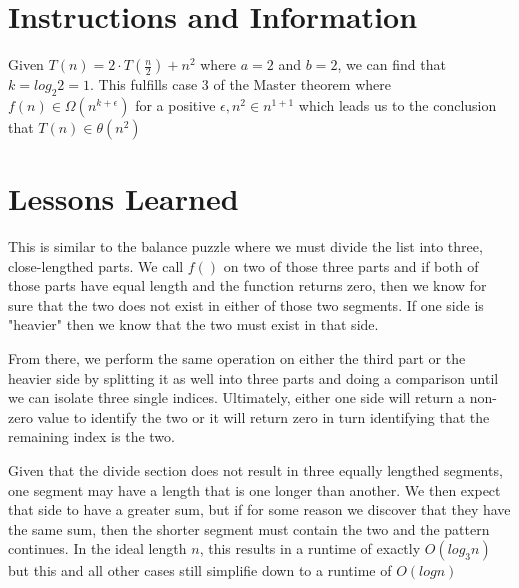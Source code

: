 \documentclass[12pt]{article}
\begin{document}
\maketitle

\section{Instructions and Information}
Given \(T(n)=2 \cdot T(\frac{n}{2})+n^2\) where \(a=2\) and \(b=2\), we can find that \(k=log_2 2=1\). This fulfills case 3 of the Master theorem where \(f(n)\in \Omega (n^{k+\epsilon } )\) for a positive \(\epsilon , n^2 \in n^{1+1} \) which leads us to the conclusion that \(T(n) \in \theta(n^2)\) \newline

\section{Lessons Learned}
This is similar to the balance puzzle where we must divide the list into three, close-lengthed parts. We call \(f()\) on two of those three parts and if both of those parts have equal length and the function returns zero, then we know for sure that the two does not exist in either of those two segments. If one side is "heavier" then we know that the two must exist in that side. \newline

\noindent From there, we perform the same operation on either the third part or the heavier side by splitting it as well into three parts and doing a comparison until we can isolate three single indices. Ultimately, either one side will return a non-zero value to identify the two or it will return zero in turn identifying that the remaining index is the two. \newline

\noindent Given that the divide section does not result in three equally lengthed segments, one segment may have a length that is one longer than another. We then expect that side to have a greater sum, but if for some reason we discover that they have the same sum, then the shorter segment must contain the two and the pattern continues. In the ideal length \(n\), this results in a runtime of exactly \(O(log_3n)\) but this and all other cases still simplifie down to a runtime of \(O(logn)\)
\end{document}
